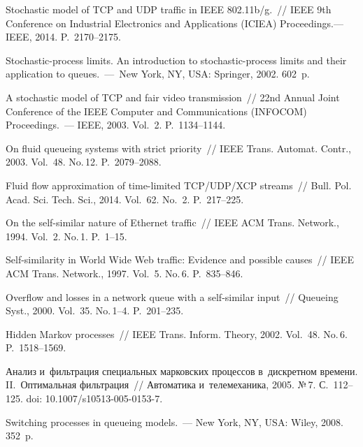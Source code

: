 \begin{multicols}{2}
{{\begin{thebibliography}{99}
 Stochastic model of
TCP and UDP traffic in IEEE 802.11b/g.~// {IEEE 9th Conference on
Industrial Electronics and Applications (ICIEA) Proceedings.}--- 
IEEE, 2014. P.~2170--2175.







 {Stochastic-process limits. An introduction to
stochastic-process limits and their application to queues.}~---~New York, NY, USA: 
Springer, 2002. 602~p.

 A stochastic model of TCP and fair video
transmission~// {22nd Annual Joint Conference of the IEEE Computer
and Communications (INFOCOM) Proceedings.}~--- IEEE, 2003. Vol.~2.
P.~1134--1144.


 On fluid queueing systems with strict
priority~// {IEEE Trans. Automat. Contr.}, 2003. Vol.~48. No.\,12.
P.~2079--2088.

Fluid flow approximation of time-limited TCP/UDP/XCP streams~//
{Bull. Pol. Acad. Sci}. Tech. Sci.,
2014. Vol.~62. No.~2. P.~217--225.

 On the
self-similar nature of Ethernet traffic~// {IEEE ACM Trans.
Network., 1994.} Vol.~2. No.\,1. P.~1--15.

 Self-similarity in World Wide Web
traffic: Evidence and possible causes~// {IEEE ACM Trans.
Network., 1997.} Vol.~5. No.\,6. P.~835--846.

 Overflow and losses in a network
queue with a self-similar input~// {Queueing Syst., 2000.}
Vol.~35. No.\,1--4. P.~201--235.

 Hidden Markov processes~// {IEEE Trans.
Inform. Theory, 2002.} Vol.~48. No.\,6. P.~1518--1569.

 Анализ и~фильтрация специальных
марковских процессов в~дискретном времени. II.~Оптимальная
фильтрация~// {Автоматика и~телемеханика, 2005.} №\,7. С.~112--125.
doi: 10.1007/s10513-005-0153-7.

 {Switching processes in queueing models.}~--- New York, NY, USA: 
Wiley, 2008. 352~p.


\end{thebibliography}}}
\end{multicols}
